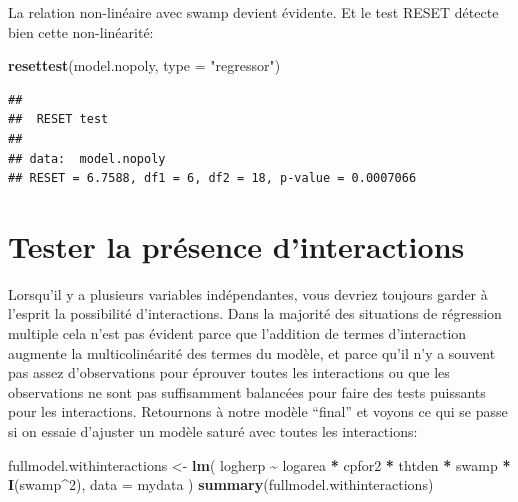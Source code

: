 \documentclass[
  12pt,
]{book}
\newenvironment{Shaded}{\begin{snugshade}}{\end{snugshade}}
\newcommand{\DataTypeTok}[1]{\textcolor[rgb]{0.13,0.29,0.53}{#1}}
\newcommand{\DecValTok}[1]{\textcolor[rgb]{0.00,0.00,0.81}{#1}}
\newcommand{\KeywordTok}[1]{\textcolor[rgb]{0.13,0.29,0.53}{\textbf{#1}}}
\newcommand{\NormalTok}[1]{#1}
\newcommand{\OperatorTok}[1]{\textcolor[rgb]{0.81,0.36,0.00}{\textbf{#1}}}
\newcommand{\StringTok}[1]{\textcolor[rgb]{0.31,0.60,0.02}{#1}}
\begin{document}
La relation non-linéaire avec swamp devient évidente. Et le test RESET détecte bien cette non-linéarité:

\begin{Shaded}
\begin{Highlighting}[]
\KeywordTok{resettest}\NormalTok{(model.nopoly, }\DataTypeTok{type =} \StringTok{"regressor"}\NormalTok{)}
\end{Highlighting}
\end{Shaded}

\begin{verbatim}
## 
##  RESET test
## 
## data:  model.nopoly
## RESET = 6.7588, df1 = 6, df2 = 18, p-value = 0.0007066
\end{verbatim}

\hypertarget{tester-la-pruxe9sence-dinteractions}{%
\section{Tester la présence d'interactions}\label{tester-la-pruxe9sence-dinteractions}}

Lorsqu'il y a plusieurs variables indépendantes, vous devriez toujours garder à l'esprit la possibilité d'interactions. Dans la majorité des situations de régression multiple cela n'est pas évident parce que l'addition de termes d'interaction augmente la multicolinéarité des termes du modèle, et parce qu'il n'y a souvent pas assez d'observations pour éprouver toutes les interactions ou que les observations ne sont pas suffisamment balancées pour faire des tests puissants pour les interactions. Retournons à notre modèle ``final'' et voyons ce qui se passe si on essaie d'ajuster un modèle saturé avec toutes les interactions:

\begin{Shaded}
\begin{Highlighting}[]
\NormalTok{fullmodel.withinteractions \textless{}{-}}\StringTok{ }\KeywordTok{lm}\NormalTok{(}
\NormalTok{  logherp }\OperatorTok{\textasciitilde{}}\StringTok{ }\NormalTok{logarea }\OperatorTok{*}\StringTok{ }\NormalTok{cpfor2 }\OperatorTok{*}\StringTok{ }\NormalTok{thtden }\OperatorTok{*}\StringTok{ }\NormalTok{swamp }\OperatorTok{*}\StringTok{ }\KeywordTok{I}\NormalTok{(swamp}\OperatorTok{\^{}}\DecValTok{2}\NormalTok{),}
  \DataTypeTok{data =}\NormalTok{ mydata}
\NormalTok{)}
\KeywordTok{summary}\NormalTok{(fullmodel.withinteractions)}
\end{Highlighting}
\end{Shaded}
\end{document}
